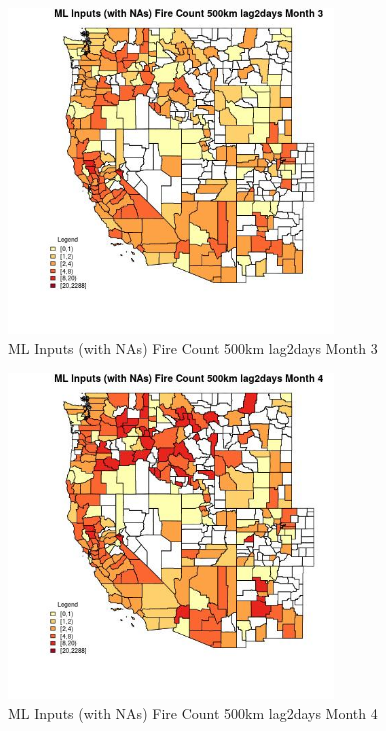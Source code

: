 \begin{figure} 
\centering  
\includegraphics[width=0.77\textwidth]{Code_Outputs/Report_ML_input_PM25_Step4_part_e_de_duplicated_aves_compiled_2019-05-20wNAs_CountyFire_Count_500km_lag2daysmedianMonth3.jpg} 
\caption{\label{fig:Report_ML_input_PM25_Step4_part_e_de_duplicated_aves_compiled_2019-05-20wNAsCountyFire_Count_500km_lag2daysmedianMonth3}ML Inputs (with NAs) Fire Count 500km lag2days Month 3} 
\end{figure} 
 

\begin{figure} 
\centering  
\includegraphics[width=0.77\textwidth]{Code_Outputs/Report_ML_input_PM25_Step4_part_e_de_duplicated_aves_compiled_2019-05-20wNAs_CountyFire_Count_500km_lag2daysmedianMonth4.jpg} 
\caption{\label{fig:Report_ML_input_PM25_Step4_part_e_de_duplicated_aves_compiled_2019-05-20wNAsCountyFire_Count_500km_lag2daysmedianMonth4}ML Inputs (with NAs) Fire Count 500km lag2days Month 4} 
\end{figure} 
 

